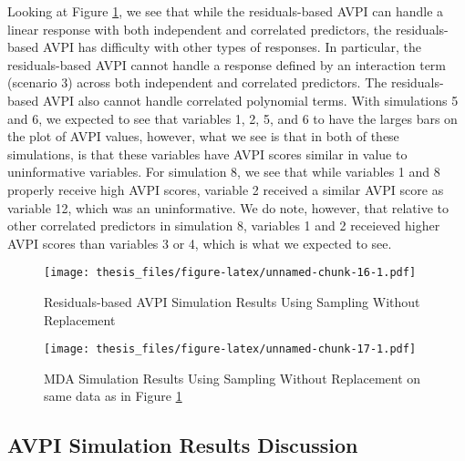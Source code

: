 \documentclass[12pt,twoside]{reedthesis}
\theoremstyle{definition}
\theoremstyle{definition}
\theoremstyle{definition}
\theoremstyle{remark}
\begin{document}
Looking at Figure \ref{resAVPI}, we see that while the residuals-based
AVPI can handle a linear response with both independent and correlated
predictors, the residuals-based AVPI has difficulty with other types of
responses. In particular, the residuals-based AVPI cannot handle a
response defined by an interaction term (scenario 3) across both
independent and correlated predictors. The residuals-based AVPI also
cannot handle correlated polynomial terms. With simulations 5 and 6, we
expected to see that variables 1, 2, 5, and 6 to have the larges bars on
the plot of AVPI values, however, what we see is that in both of these
simulations, is that these variables have AVPI scores similar in value
to uninformative variables. For simulation 8, we see that while
variables 1 and 8 properly receive high AVPI scores, variable 2 received
a similar AVPI score as variable 12, which was an uninformative. We do
note, however, that relative to other correlated predictors in
simulation 8, variables 1 and 2 receieved higher AVPI scores than
variables 3 or 4, which is what we expected to see. \par
\begin{figure}
\centering
\texttt{[image: thesis\_files/figure-latex/unnamed-chunk-16-1.pdf]}
\caption{\label{fig:unnamed-chunk-16}\label{resAVPI}Residuals-based AVPI
Simulation Results Using Sampling Without Replacement}
\end{figure}
\begin{figure}
\centering
\texttt{[image: thesis\_files/figure-latex/unnamed-chunk-17-1.pdf]}
\caption{\label{fig:unnamed-chunk-17}\label{MDAwrep2}MDA Simulation Results
Using Sampling Without Replacement on same data as in Figure
\ref{resAVPI}}
\end{figure}
\subsection{AVPI Simulation Results
Discussion}\label{avpi-simulation-results-discussion}
\end{document}
